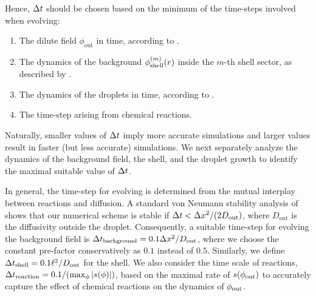 Hence, $\Delta t$ should be chosen based on the minimum of the time-steps involved when evolving:
\begin{enumerate}
    \item The dilute field $\phi_{\mathrm{out}}$ in time, according to .
    
    \item The dynamics of the background $\phi_\mathrm{shell}^{(m)}(r)$ inside the $m$-th shell sector, as described by .
    
    \item The dynamics of the droplets in time, according to .
    
    \item The time-step arising from chemical reactions.
\end{enumerate}
Naturally, smaller values of $\Delta t$ imply more accurate simulations and larger values result in faster (but less accurate) simulations.
We next separately analyze the dynamics of the background field, the shell, and the droplet growth to identify the maximal suitable value of $\Delta t$.

In general, the time-step for evolving  is determined from the mutual interplay between reactions and diffusion.
A standard von Neumann stability analysis of  shows that our numerical scheme is stable if $\Delta t < \Delta x^2/(2 D_\mathrm{out})$, where $D_\mathrm{out}$ is the diffusivity outside the droplet.
Consequently, a suitable time-step for evolving the background field is $\Delta t_\mathrm{background} = 0.1 \Delta x^2/D_\mathrm{out}$, where we choose the constant pre-factor conservatively as $0.1$ instead of $0.5$.
Similarly, we define $\Delta t_\mathrm{shell} = 0.1 \ell^2/D_\mathrm{out}$ for the shell.
We also consider the time scale of reactions, $\Delta t_\mathrm{reaction} = 0.1 / (\max_\phi |s(\phi)|)$, based on the maximal rate of $s(\phi_\mathrm{out})$ to accurately capture the effect of chemical reactions on the dynamics of $\phi_\mathrm{out}$.

